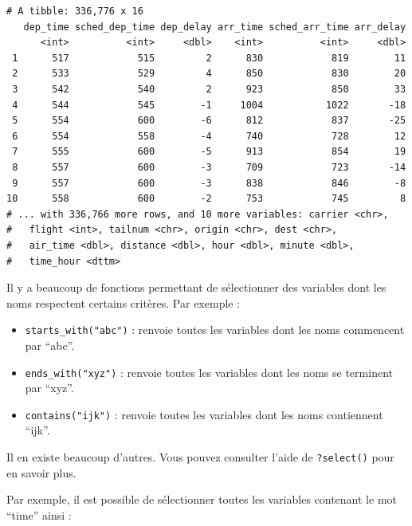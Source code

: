\documentclass[
  a4paper,
]{article}
\newenvironment{Shaded}{\begin{snugshade}}{\end{snugshade}}
\newcommand{\KeywordTok}[1]{\textcolor[rgb]{0.12,0.11,0.11}{\textbf{#1}}}
\newcommand{\NormalTok}[1]{\textcolor[rgb]{0.12,0.11,0.11}{#1}}
\newcommand{\OperatorTok}[1]{\textcolor[rgb]{0.12,0.11,0.11}{#1}}
\newcommand{\StringTok}[1]{\textcolor[rgb]{0.75,0.01,0.01}{#1}}
\providecommand{\tightlist}{%
  \setlength{\itemsep}{0pt}\setlength{\parskip}{0pt}}
\begin{document}
\begin{verbatim}
# A tibble: 336,776 x 16
   dep_time sched_dep_time dep_delay arr_time sched_arr_time arr_delay
      <int>          <int>     <dbl>    <int>          <int>     <dbl>
 1      517            515         2      830            819        11
 2      533            529         4      850            830        20
 3      542            540         2      923            850        33
 4      544            545        -1     1004           1022       -18
 5      554            600        -6      812            837       -25
 6      554            558        -4      740            728        12
 7      555            600        -5      913            854        19
 8      557            600        -3      709            723       -14
 9      557            600        -3      838            846        -8
10      558            600        -2      753            745         8
# ... with 336,766 more rows, and 10 more variables: carrier <chr>,
#   flight <int>, tailnum <chr>, origin <chr>, dest <chr>,
#   air_time <dbl>, distance <dbl>, hour <dbl>, minute <dbl>,
#   time_hour <dttm>
\end{verbatim}

Il y a beaucoup de fonctions permettant de sélectionner des variables dont les noms respectent certains critères. Par exemple :

\begin{itemize}
\tightlist
\item
  \texttt{starts\_with("abc")} : renvoie toutes les variables dont les noms commencent par ``abc''.
\item
  \texttt{ends\_with("xyz")} : renvoie toutes les variables dont les noms se terminent par ``xyz''.
\item
  \texttt{contains("ijk")} : renvoie toutes les variables dont les noms contiennent ``ijk''.
\end{itemize}

Il en existe beaucoup d'autres. Vous pouvez consulter l'aide de \texttt{?select()} pour en savoir plus.

Par exemple, il est possible de sélectionner toutes les variables contenant le mot ``time'' ainsi :

\begin{Shaded}
\end{Shaded}
\end{document}
